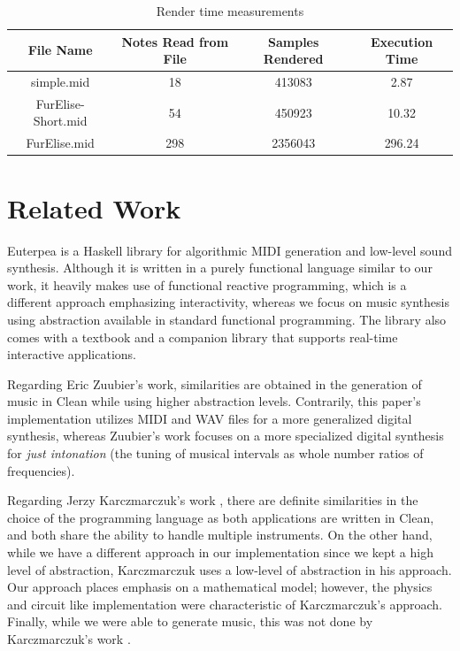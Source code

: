 \documentclass[runningheads]{llncs}
\begin{document}
\renewcommand{\arraystretch}{1.0}
\begin{table}[H]
\centering
\begin{tabu}{|c|c|c|c|}
\hline
File Name  & Notes Read from File & Samples Rendered & Execution Time \\ \hline
simple.mid & 18 & 413083 & 2.87 \\ \hline
FurElise-Short.mid & 54 & 450923 & 10.32 \\ \hline
FurElise.mid & 298 & 2356043 & 296.24 \\ \hline
\end{tabu}
\caption{ Render time measurements }
\label{tab:results}
\end{table}

\section{Related Work}\label{sec:RelatedWork}

Euterpea \cite{euterpea} is a Haskell library for algorithmic MIDI
generation and low-level sound synthesis. Although it is written in a
purely functional language similar to our work, it heavily makes use
of functional reactive programming, which is a different approach
emphasizing interactivity, whereas we focus on music synthesis using
abstraction available in standard functional programming. The library also
comes with a textbook \cite{music} and a companion library that supports
real-time interactive applications.

Regarding Eric Zuubier's \cite{organ} work, similarities are obtained in the generation of music in Clean while using higher abstraction levels. Contrarily, this paper's implementation utilizes MIDI and WAV files for a more generalized digital synthesis, whereas Zuubier's work focuses on a more specialized digital synthesis for \emph{just intonation} (the tuning of musical intervals as whole number ratios of frequencies).\label{gloss:JustIntonantion}

Regarding Jerzy Karczmarczuk's work \cite{FuncFrameSynth}, there are definite similarities in the choice of the programming language as both applications are written in Clean, and both share the ability to handle multiple instruments. On the other hand, while we have a different approach in our implementation since we kept a high level of abstraction, Karczmarczuk uses a low-level of abstraction in his approach. Our approach places emphasis on a mathematical model; however, the physics and circuit like implementation were characteristic of Karczmarczuk's approach. Finally, while we were able to generate music, this was not done by Karczmarczuk's work \cite{FuncFrameSynth}.
\end{document}
